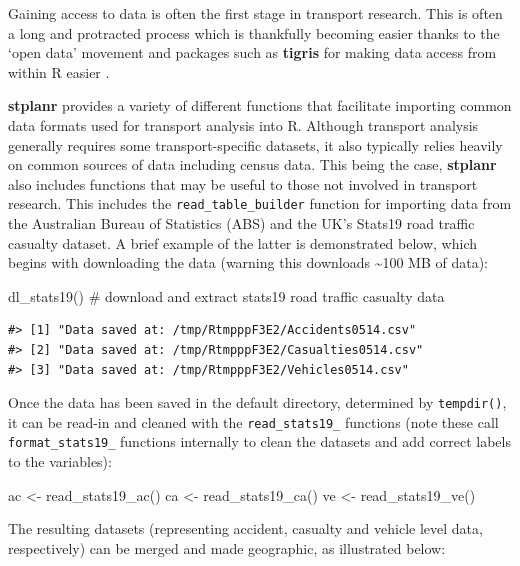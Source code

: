 Gaining access to data is often the first stage in transport research.
This is often a long and protracted process which is thankfully becoming
easier thanks to the `open data' movement and packages such as
\textbf{tigris} for making data access from within R easier
\citep{walker_tigris:_2016}.

\textbf{stplanr} provides a variety of different functions that
facilitate importing common data formats used for transport analysis
into R. Although transport analysis generally requires some
transport-specific datasets, it also typically relies heavily on common
sources of data including census data. This being the case,
\textbf{stplanr} also includes functions that may be useful to those not
involved in transport research. This includes the
\texttt{read\_table\_builder} function for importing data from the
Australian Bureau of Statistics (ABS) and the UK's Stats19 road traffic
casualty dataset. A brief example of the latter is demonstrated below,
which begins with downloading the data (warning this downloads
\textasciitilde{}100 MB of data):

\begin{Schunk}
\begin{Sinput}
dl_stats19() # download and extract stats19 road traffic casualty data
\end{Sinput}
\end{Schunk}

\begin{verbatim}
#> [1] "Data saved at: /tmp/RtmpppF3E2/Accidents0514.csv"
#> [2] "Data saved at: /tmp/RtmpppF3E2/Casualties0514.csv"
#> [3] "Data saved at: /tmp/RtmpppF3E2/Vehicles0514.csv"
\end{verbatim}

Once the data has been saved in the default directory, determined by
\texttt{tempdir()}, it can be read-in and cleaned with the
\texttt{read\_stats19\_} functions (note these call
\texttt{format\_stats19\_} functions internally to clean the datasets
and add correct labels to the variables):

\begin{Schunk}
\begin{Sinput}
ac <- read_stats19_ac()
ca <- read_stats19_ca()
ve <- read_stats19_ve()
\end{Sinput}
\end{Schunk}

The resulting datasets (representing accident, casualty and vehicle
level data, respectively) can be merged and made geographic, as
illustrated below:

